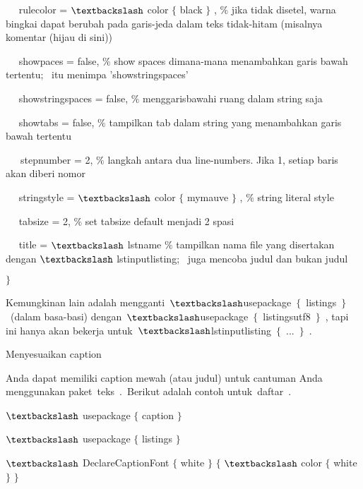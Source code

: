 ~~ rulecolor = $\textbackslash$ color $ \{ $ black $ \} $ , $\%$ jika tidak disetel, warna bingkai dapat berubah pada garis-jeda dalam teks tidak-hitam (misalnya komentar (hijau di sini))\par

~~ showpaces = false, $\%$ show spaces dimana-mana menambahkan garis bawah tertentu;~ itu menimpa 'showstringspaces'\par

~~ showstringspaces = false, $\%$ menggarisbawahi ruang dalam string saja\par

~~ showtabs = false, $\%$ tampilkan tab dalam string yang menambahkan garis bawah tertentu\par

~~~stepnumber = 2, $\%$ langkah antara dua line-numbers.  Jika 1, setiap baris akan diberi nomor\par

~~ stringstyle = $\textbackslash$ color $ \{ $ mymauve $ \} $ , $\%$ string literal style\par

~~ tabsize = 2, $\%$ set tabsize default menjadi 2 spasi\par

~~ title = $\textbackslash$ lstname $\%$ tampilkan nama file yang disertakan dengan $\textbackslash$ lstinputlisting;~ juga mencoba judul dan bukan judul\par

 $ \} $\par

Kemungkinan lain adalah mengganti $\textbackslash$usepackage $ \{ $ listings $ \} $ (dalam basa-basi) dengan $\textbackslash$usepackage $ \{ $ listingsutf8 $ \} $ , tapi ini hanya akan bekerja untuk $\textbackslash$lstinputlisting $ \{ $ ... $ \} $ .\par

Menyesuaikan caption \par

Anda dapat memiliki caption mewah (atau judul) untuk cantuman Anda menggunakan paket teks . Berikut adalah contoh untuk daftar .\par

 $\textbackslash$ usepackage $ \{ $ caption $ \} $\par

 $\textbackslash$ usepackage $ \{ $ listings $ \} $\par

 $\textbackslash$ DeclareCaptionFont $ \{ $ white $ \} $ $ \{ $ $\textbackslash$ color $ \{ $ white $ \} $ $ \} $\par

